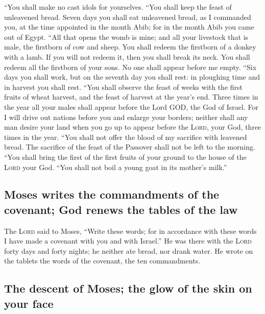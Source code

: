 ``You shall make no cast idols for yourselves.
 ``You shall keep the feast of unleavened bread. Seven
days you shall eat unleavened bread, as I commanded you, at the time
appointed in the month Abib; for in the month Abib you came out of
Egypt.  ``All that opens the womb is mine; and all your
livestock that is male, the firstborn of cow and sheep. 
You shall redeem the firstborn of a donkey with a lamb. If you will not
redeem it, then you shall break its neck. You shall redeem all the
firstborn of your sons. No one shall appear before me empty.
 ``Six days you shall work, but on the seventh day you
shall rest: in ploughing time and in harvest you shall rest.
 ``You shall observe the feast of weeks with the first
fruits of wheat harvest, and the feast of harvest at the year's end.
 Three times in the year all your males shall appear
before the Lord GOD, the God of Israel.  For I will drive
out nations before you and enlarge your borders; neither shall any man
desire your land when you go up to appear before the \textsc{Lord}, your
God, three times in the year.  ``You shall not offer the
blood of my sacrifice with leavened bread. The sacrifice of the feast of
the Passover shall not be left to the morning.  ``You
shall bring the first of the first fruits of your ground to the house of
the \textsc{Lord} your God. ``You shall not boil a young goat in its
mother's milk.''

\hypertarget{moses-writes-the-commandments-of-the-covenant-god-renews-the-tables-of-the-law}{%
\subsection{Moses writes the commandments of the covenant; God renews
the tables of the
law}\label{moses-writes-the-commandments-of-the-covenant-god-renews-the-tables-of-the-law}}

 The \textsc{Lord} said to Moses, ``Write these words;
for in accordance with these words I have made a covenant with you and
with Israel.''  He was there with the \textsc{Lord} forty
days and forty nights; he neither ate bread, nor drank water. He wrote
on the tablets the words of the covenant, the ten commandments.

\hypertarget{the-descent-of-moses-the-glow-of-the-skin-on-your-face}{%
\subsection{The descent of Moses; the glow of the skin on your
face}\label{the-descent-of-moses-the-glow-of-the-skin-on-your-face}}

